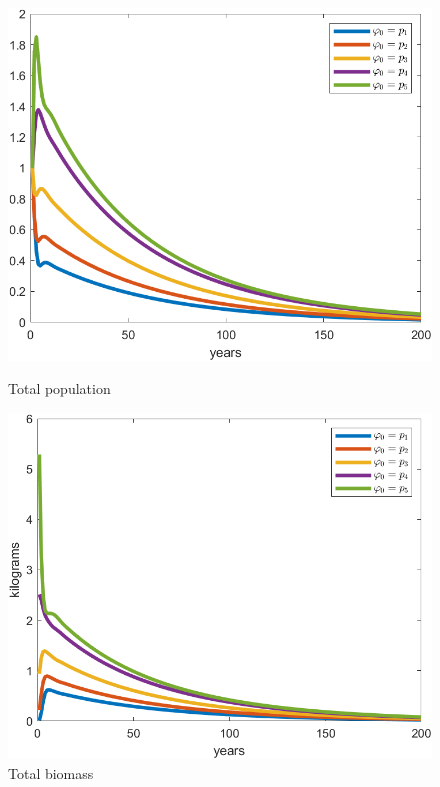 \begin{figure}[H]
	\centering
	\begin{minipage}{.48\textwidth}
	\includegraphics[width=\linewidth]{Images/F=0.05/total_pop_when_f=0.05}
	\caption{Total population}
	\label{fig:totalpopwhenf=0.05}
	\end{minipage} \quad 
	\centering
	\begin{minipage}{.48\textwidth}
	\includegraphics[width=\linewidth]{Images/F=0.05/total_biomass_when_f=0.05}
	\caption{Total biomass}
	\label{fig:totalbiomasswhenf=0.05}
	\end{minipage}
\end{figure}

